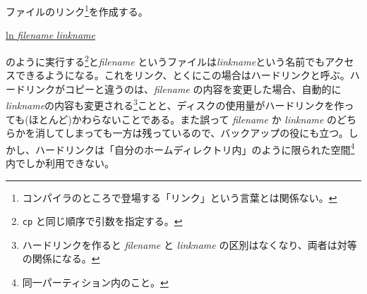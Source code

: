 \begin{itemize}


ファイルのリンク\footnote{コンパイラのところで登場する「リンク」という言葉とは関係ない。}を作成する。
\begin{commandline2}
\prompt \underline{ln {\it filename} {\it linkname}}
\end{commandline2} \noindent
のように実行する\footnote{{\tt cp} と同じ順序で引数を指定する。}と{\it filename} というファイルは{\it linkname}という名前でもアクセスできるようになる。これをリンク、とくにこの場合はハードリンクと呼ぶ。ハードリンクがコピーと違うのは、{\it filename} の内容を変更した場合、自動的に {\it linkname}の内容も変更される\footnote{ハードリンクを作ると {\it filename} と {\it linkname} の区別はなくなり、両者は対等の関係になる。}ことと、ディスクの使用量がハードリンクを作っても(ほとんど)かわらないことである。また誤って {\it filename} か {\it linkname} のどちらかを消してしまっても一方は残っているので、バックアップの役にも立つ。しかし、ハードリンクは「自分のホームディレクトリ内」のように限られた空間\footnote{同一パーティション内のこと。}内でしか利用できない。


\end{itemize}

